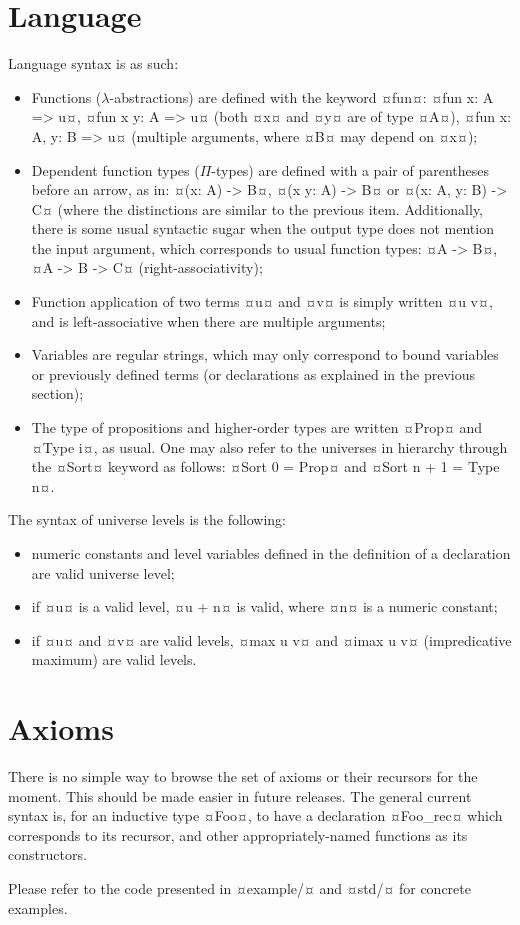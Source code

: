 \documentclass[twocolumn]{article}
\begin{document}
\section{Language}
Language syntax is as such:
\begin{itemize}
	\item Functions (\(\lambda\)-abstractions) are defined with the keyword ¤fun¤:
		¤fun x: A => u¤, ¤fun x y: A => u¤ (both ¤x¤ and ¤y¤ are of type ¤A¤),
		¤fun x: A, y: B => u¤ (multiple arguments, where ¤B¤ may depend on ¤x¤);

	\item Dependent function types (\(\Pi\)-types) are defined with a pair of parentheses
		before an arrow, as in: ¤(x: A) -> B¤, ¤(x y: A) -> B¤ or
		¤(x: A, y: B) -> C¤ (where the distinctions are similar to the previous
		item. Additionally, there is some usual syntactic sugar when the output
		type does not mention the input argument, which corresponds to usual
		function types: ¤A -> B¤, ¤A -> B -> C¤ (right-associativity);

	\item Function application of two terms ¤u¤ and ¤v¤ is simply written ¤u v¤,
		and is left-associative when there are multiple arguments;

	\item Variables are regular strings, which may only correspond to bound
		variables or previously defined terms (or declarations as explained in the
		previous section);

	\item The type of propositions and higher-order types are written ¤Prop¤ and
		¤Type i¤, as usual. One may also refer to the universes in hierarchy through
    the ¤Sort¤ keyword as follows: ¤Sort 0 = Prop¤ and ¤Sort n + 1 = Type n¤.
\end{itemize}

The syntax of universe levels is the following:
\begin{itemize}
	\item numeric constants and level variables defined in the definition of a
		declaration are valid universe level;
	\item if ¤u¤ is a valid level, ¤u + n¤ is valid, where ¤n¤ is a numeric
		constant;
	\item if ¤u¤ and ¤v¤ are valid levels, ¤max u v¤ and ¤imax u v¤ (impredicative
		maximum) are valid levels.
\end{itemize}

\section{Axioms}
There is no simple way to browse the set of axioms or their recursors for the
moment. This should be made easier in future releases. The general current
syntax is, for an inductive type ¤Foo¤, to have a declaration ¤Foo_rec¤ which
corresponds to its recursor, and other appropriately-named functions as its
constructors.

Please refer to the code presented in ¤example/¤ and ¤std/¤ for concrete
examples.
\end{document}
